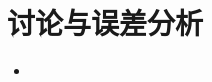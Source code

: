 \documentclass[a4paper]{article}
\begin{document}
\section{讨论与误差分析}
\begin{itemize}
	\item
\end{itemize}
\end{document}

